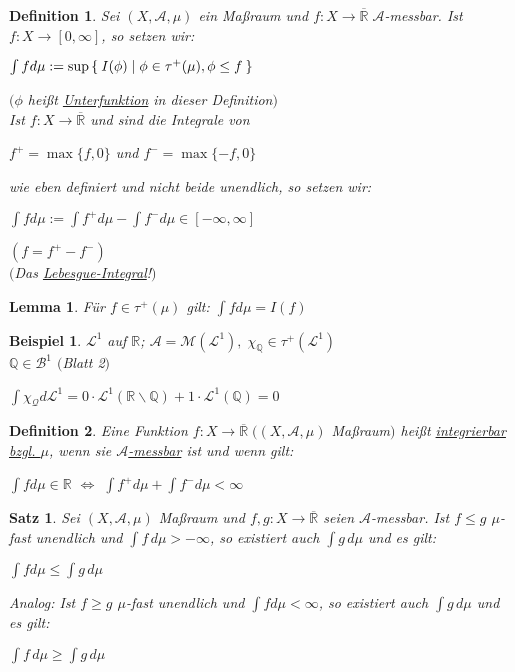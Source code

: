 \documentclass[11pt]{memoir}
\theoremstyle{changebreak}
\newtheorem{Definition}{Definition}[chapter]
\newtheorem{Beispiel}{Beispiel}[chapter]
\newtheorem{Lemma}{Lemma}[chapter]
\newtheorem{Satz}{Satz}[chapter]
\begin{document}
\begin{Definition}
Sei $(X, \mathscr A, \mu)$ ein Maßraum und $f: X \rightarrow \overline{\mathbb R}\; \mathscr A$-messbar. Ist $f: X \rightarrow [0, \infty]$, so setzen wir:
\begin{center}
	$\int f d\mu := \sup\Set{I(\phi) | \phi \in \tau^+(\mu), \phi \leq f}$ 
\end{center}
$(\phi$ heißt \underline{Unterfunktion} in dieser Definition$)$ \\

Ist $f: X \rightarrow \overline{\mathbb R}$ und sind die Integrale von
\begin{center}
	$f^+ = \max \{f, 0\}$ und $f^- = \max\{-f, 0\}$ 
\end{center}
wie eben definiert und nicht beide unendlich, so setzen wir: 
\begin{center}
	$\int f d\mu := \int f^+ d\mu - \int f^- d\mu \in [-\infty, \infty]$ 
\end{center}
$(f = f^+ - f^-)$ \\
$($Das \underline{Lebesgue-Integral}!$)$
\end{Definition}

\begin{Lemma}
Für $f \in \tau^+ (\mu)$ gilt: $\int f d\mu = I(f)$
\end{Lemma}

\begin{Beispiel}
$\mathscr L^1$ auf $\mathbb R$; $\mathscr A = \mathscr M(\mathscr L^1), \;\chi_\mathbb Q \in \tau^+ (\mathscr L^1)$ \\
$\mathbb Q \in \mathscr B^1$ $($Blatt 2$)$ 
\begin{center}
	$\int \chi_\mathscr Q d\mathscr L^1 = 0 \cdotp \mathscr L^1(\mathbb R \backslash \mathbb Q) + 1 \cdotp \mathscr L^1(\mathbb Q) = 0$
\end{center}
\end{Beispiel}

\begin{Definition}
Eine Funktion $f: X \rightarrow \overline{\mathbb R} \;((X, \mathscr A, \mu)$ Maßraum$)$ heißt \underline{integrierbar bzgl. $\mu$}, wenn sie \underline{$\mathscr A$-messbar} ist und wenn gilt: 
\begin{center}
	$\int f d\mu \in \mathbb R$ $\Leftrightarrow$ $\int f^+ d\mu + \int f^- d\mu < \infty$
\end{center}
\end{Definition}

\begin{Satz}
Sei $(X, \mathscr A, \mu)$ Maßraum und $f, g: X \rightarrow \overline{\mathbb R}$ seien $\mathscr A$-messbar. Ist $f \leq g$ $\mu$-fast unendlich und $\int f \, d\mu > -\infty$, so existiert auch $\int g \,d\mu$ und es gilt: 
\begin{center}
	$\int f d\mu \leq \int g \,d\mu$ 
\end{center}
Analog:  Ist $f \geq g$ $\mu$-fast unendlich und $\int f d\mu < \infty$, so existiert auch $\int g \,d\mu$ und es gilt: 
\begin{center}
	$\int f \,d\mu \geq \int g \,d\mu$
\end{center}
\end{Satz}
\end{document}
